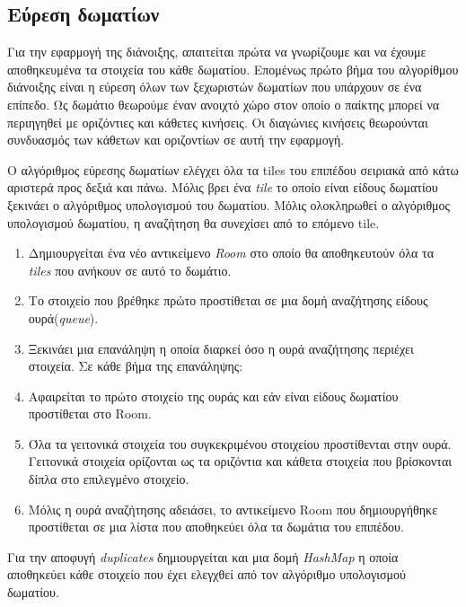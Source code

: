 \subsection{Εύρεση δωματίων}
\par
Για την εφαρμογή της διάνοιξης, απαιτείται πρώτα να γνωρίζουμε και να έχουμε αποθηκευμένα τα στοιχεία του κάθε δωματίου. Επομένως πρώτο βήμα του αλγορίθμου διάνοιξης είναι η εύρεση όλων των ξεχωριστών δωματίων που υπάρχουν σε ένα επίπεδο. Ως δωμάτιο θεωρούμε έναν ανοιχτό χώρο στον οποίο ο παίκτης μπορεί να περιηγηθεί με οριζόντιες και κάθετες κινήσεις. Οι διαγώνιες κινήσεις θεωρούνται συνδυασμός των κάθετων και οριζοντίων σε αυτή την εφαρμογή.
\par
O αλγόριθμος εύρεσης δωματίων ελέγχει όλα τα tiles του επιπέδου σειριακά από κάτω αριστερά προς δεξιά και πάνω. Μόλις βρει ένα \textit{tile} το οποίο είναι είδους δωματίου ξεκινάει ο αλγόριθμος υπολογισμού του δωματίου. Μόλις ολοκληρωθεί ο αλγόριθμος υπολογισμού δωματίου, η αναζήτηση θα συνεχίσει από το επόμενο tile.
\begin{enumerate}
\item Δημιουργείται ένα νέο αντικείμενο \textit{Room} στο οποίο θα αποθηκευτούν όλα τα \textit{tiles} που ανήκουν σε αυτό το δωμάτιο.
\item Το στοιχείο που βρέθηκε πρώτο προστίθεται σε μια δομή αναζήτησης είδους ουρά(\textit{queue}).
\item Ξεκινάει μια επανάληψη η οποία διαρκεί όσο η ουρά αναζήτησης περιέχει στοιχεία. Σε κάθε βήμα της επανάληψης:
\item Αφαιρείται το πρώτο στοιχείο της ουράς και εάν είναι είδους δωματίου προστίθεται στο Room.
\item Όλα τα γειτονικά στοιχεία του συγκεκριμένου στοιχείου προστίθενται στην ουρά. Γειτονικά στοιχεία ορίζονται ως τα οριζόντια και κάθετα στοιχεία που βρίσκονται δίπλα στο επιλεγμένο στοιχείο.
\item Μόλις η ουρά αναζήτησης αδειάσει, το αντικείμενο Room που δημιουργήθηκε προστίθεται σε μια λίστα που αποθηκεύει όλα τα δωμάτια του επιπέδου.
\end{enumerate}
Για την αποφυγή \textit{duplicates} δημιουργείται και μια δομή \textit{HashMap} η οποία αποθηκεύει κάθε στοιχείο που έχει ελεγχθεί από τον αλγόριθμο υπολογισμού δωματίου.

